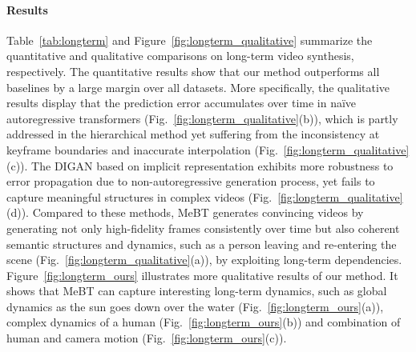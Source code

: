 \documentclass[10pt,twocolumn,letterpaper]{article}
\begin{document}
\paragraph{Results}
Table~\ref{tab:longterm} and Figure~\ref{fig:longterm_qualitative} summarize the quantitative and qualitative comparisons on long-term video synthesis, respectively.
The quantitative results show that our method outperforms all baselines by a large margin over all datasets.
More specifically, the qualitative results display that the prediction error accumulates over time in na\"ive autoregressive transformers (Fig.~\ref{fig:longterm_qualitative}(b)), which is partly addressed in the hierarchical method yet suffering from the inconsistency at keyframe boundaries and inaccurate interpolation (Fig.~\ref{fig:longterm_qualitative}(c)). 
The DIGAN based on implicit representation exhibits more robustness to error propagation due to non-autoregressive generation process, yet fails to capture meaningful structures in complex videos (Fig.~\ref{fig:longterm_qualitative}(d)).
Compared to these methods, MeBT generates convincing videos by generating not only high-fidelity frames consistently over time but also coherent semantic structures and dynamics, such as a person leaving and re-entering the scene (Fig.~\ref{fig:longterm_qualitative}(a)), by exploiting long-term dependencies.
Figure~\ref{fig:longterm_ours} illustrates more qualitative results of our method.
It shows that MeBT can capture interesting long-term dynamics, such as global dynamics as the sun goes down over the water (Fig.~\ref{fig:longterm_ours}(a)), complex dynamics of a human (Fig.~\ref{fig:longterm_ours}(b)) and combination of human and camera motion (Fig.~\ref{fig:longterm_ours}(c)).
\end{document}
